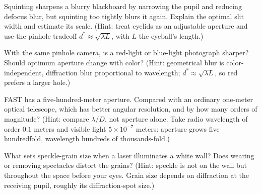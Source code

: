 \begin{puzzles}
\item Squinting sharpens a blurry blackboard by narrowing the pupil and reducing defocus blur, but squinting too tightly blurs it again. Explain the optimal slit width and estimate its scale. (Hint: treat eyelids as an adjustable aperture and use the pinhole tradeoff \(d^{*}\approx\sqrt{\lambda L}\), with \(L\) the eyeball's length.)
\item With the same pinhole camera, is a red-light or blue-light photograph sharper? Should optimum aperture change with color? (Hint: geometrical blur is color-independent, diffraction blur proportional to wavelength; \(d^{*}\approx\sqrt{\lambda L}\), so red prefers a larger hole.)
\item FAST has a five-hundred-meter aperture. Compared with an ordinary one-meter optical telescope, which has better angular resolution, and by how many orders of magnitude? (Hint: compare \(\lambda/D\), not aperture alone. Take radio wavelength of order \(0.1\) meters and visible light \(5\times10^{-7}\) meters: aperture grows five hundredfold, wavelength hundreds of thousands-fold.)
\item What sets speckle-grain size when a laser illuminates a white wall? Does wearing or removing spectacles distort the grains? (Hint: speckle is not on the wall but throughout the space before your eyes. Grain size depends on diffraction at the receiving pupil, roughly its diffraction-spot size.)
\end{puzzles}
